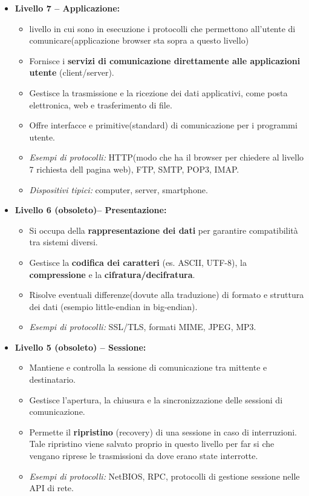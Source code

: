 \documentclass[a4paper,12pt]{report}
\begin{document}
\vspace{1cm}
\begin{itemize}
         \item \textbf{Livello 7 – Applicazione:}  
    \begin{itemize}
        \item livello in cui sono in esecuzione i protocolli che permettono all'utente di comunicare(applicazione browser sta sopra a questo livello)
        \item Fornisce i \textbf{servizi di comunicazione direttamente alle applicazioni utente} (client/server).
        \item Gestisce la trasmissione e la ricezione dei dati applicativi, come posta elettronica, web e trasferimento di file.
        \item Offre interfacce e primitive(standard) di comunicazione per i programmi utente.
        \item \textit{Esempi di protocolli:} HTTP(modo che ha il browser per chiedere al livello 7 richiesta dell pagina web), FTP, SMTP, POP3, IMAP.
        \item \textit{Dispositivi tipici:} computer, server, smartphone.
    \end{itemize}

    \item \textbf{Livello 6 (obsoleto)– Presentazione:}  
    \begin{itemize}
        \item Si occupa della \textbf{rappresentazione dei dati} per garantire compatibilità tra sistemi diversi.
        \item Gestisce la \textbf{codifica dei caratteri} (es. ASCII, UTF-8), la \textbf{compressione} e la \textbf{cifratura/decifratura}.
        \item Risolve eventuali differenze(dovute alla traduzione) di formato e struttura dei dati (esempio little-endian in big-endian).
        \item \textit{Esempi di protocolli:} SSL/TLS, formati MIME, JPEG, MP3.
    \end{itemize}

    \item \textbf{Livello 5 (obsoleto) – Sessione:}  
    \begin{itemize}
        \item Mantiene e controlla la sessione di comunicazione tra mittente e destinatario.
        \item Gestisce l’apertura, la chiusura e la sincronizzazione delle sessioni di comunicazione.
        \item Permette il \textbf{ripristino} (recovery) di una sessione in caso di interruzioni. Tale ripristino viene salvato proprio in questo livello per far si che vengano riprese le trasmissioni da dove erano state interrotte.
        \item \textit{Esempi di protocolli:} NetBIOS, RPC, protocolli di gestione sessione nelle API di rete.
    \end{itemize}


\end{itemize}
\end{document}
